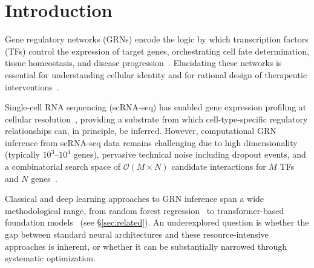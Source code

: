\documentclass[10pt,twocolumn]{article}
\begin{document}
\vspace{0.5em}

\section{Introduction}
\label{sec:introduction}

Gene regulatory networks (GRNs) encode the logic by which transcription factors (TFs) control the expression of target genes, orchestrating cell fate determination, tissue homeostasis, and disease progression~\cite{davidson2002genomic,barabasi2004network}.
Elucidating these networks is essential for understanding cellular identity and for rational design of therapeutic interventions~\cite{hecker2009gene,karlebach2008modelling}.

Single-cell RNA sequencing (scRNA-seq) has enabled gene expression profiling at cellular resolution~\cite{tang2009mrna,zheng2017massively}, providing a substrate from which cell-type-specific regulatory relationships can, in principle, be inferred.
However, computational GRN inference from scRNA-seq data remains challenging due to high dimensionality (typically $10^3$--$10^4$ genes), pervasive technical noise including dropout events, and a combinatorial search space of $\mathcal{O}(M \times N)$ candidate interactions for $M$ TFs and $N$ genes~\cite{pratapa2020benchmarking,chen2019evaluating}.

Classical and deep learning approaches to GRN inference span a wide methodological range, from random forest regression~\cite{huynh2010inferring} to transformer-based foundation models~\cite{cui2024scgpt,theodoris2023transfer} (see \S\ref{sec:related}).
An underexplored question is whether the gap between standard neural architectures and these resource-intensive approaches is inherent, or whether it can be substantially narrowed through systematic optimization.
\end{document}
